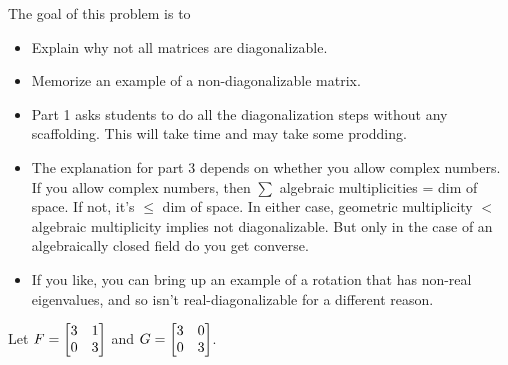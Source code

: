 	\question
	\begin{annotation}
		\begin{goals}

			The goal of this problem is to
			\begin{itemize}
				\item Explain why not all matrices are diagonalizable.
				\item Memorize an example of a non-diagonalizable matrix.
			\end{itemize}
		\end{goals}

		\begin{notes}
			\begin{itemize}
				\item Part 1 asks students to do all the diagonalization steps
					without any scaffolding. This will take time and may take
					some prodding.
				\item The explanation for part 3 depends on whether you allow complex numbers.
					If you allow complex numbers, then $\sum$ algebraic multiplicities = dim
					of space. If not, it's $\leq$ dim of space. In either case, geometric
					multiplicity $<$ algebraic multiplicity implies not diagonalizable. 
					But only in the case of an algebraically closed field do you get
					converse.
				\item If you like, you can bring up an example of a rotation that has non-real
					eigenvalues, and so isn't real-diagonalizable for a different reason.
			\end{itemize}
		\end{notes}
	\end{annotation}
	Let $F=\mat{3&1\\0&3}$ and $G=\mat{3&0\\0&3}$.
